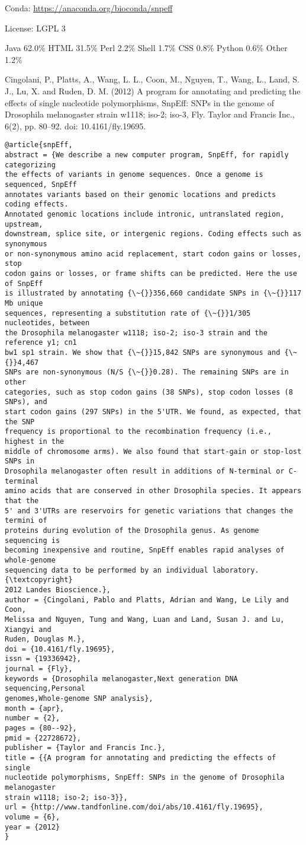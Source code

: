 \documentclass[]{article}
\begin{document}
Conda: \url{https://anaconda.org/bioconda/snpeff}

License: LGPL 3

Java 62.0\% HTML 31.5\% Perl 2.2\% Shell 1.7\% CSS 0.8\% Python 0.6\% Other 1.2\%



Cingolani, P., Platts, A., Wang, L. L., Coon, M., Nguyen, T., Wang, L., Land, S. J., Lu, X. and Ruden, D. M. (2012) A program for annotating and predicting the effects of single nucleotide polymorphisms, SnpEff: SNPs in the genome of Drosophila melanogaster strain w1118; iso-2; iso-3, Fly. Taylor and Francis Inc., 6(2), pp. 80–92. doi: 10.4161/fly.19695.

\begin{verbatim}
@article{snpEff,
abstract = {We describe a new computer program, SnpEff, for rapidly categorizing
the effects of variants in genome sequences. Once a genome is sequenced, SnpEff
annotates variants based on their genomic locations and predicts coding effects.
Annotated genomic locations include intronic, untranslated region, upstream,
downstream, splice site, or intergenic regions. Coding effects such as synonymous
or non-synonymous amino acid replacement, start codon gains or losses, stop
codon gains or losses, or frame shifts can be predicted. Here the use of SnpEff
is illustrated by annotating {\~{}}356,660 candidate SNPs in {\~{}}117 Mb unique
sequences, representing a substitution rate of {\~{}}1/305 nucleotides, between
the Drosophila melanogaster w1118; iso-2; iso-3 strain and the reference y1; cn1
bw1 sp1 strain. We show that {\~{}}15,842 SNPs are synonymous and {\~{}}4,467
SNPs are non-synonymous (N/S {\~{}}0.28). The remaining SNPs are in other
categories, such as stop codon gains (38 SNPs), stop codon losses (8 SNPs), and
start codon gains (297 SNPs) in the 5'UTR. We found, as expected, that the SNP
frequency is proportional to the recombination frequency (i.e., highest in the
middle of chromosome arms). We also found that start-gain or stop-lost SNPs in
Drosophila melanogaster often result in additions of N-terminal or C-terminal
amino acids that are conserved in other Drosophila species. It appears that the
5' and 3'UTRs are reservoirs for genetic variations that changes the termini of
proteins during evolution of the Drosophila genus. As genome sequencing is
becoming inexpensive and routine, SnpEff enables rapid analyses of whole-genome
sequencing data to be performed by an individual laboratory. {\textcopyright}
2012 Landes Bioscience.},
author = {Cingolani, Pablo and Platts, Adrian and Wang, Le Lily and Coon,
Melissa and Nguyen, Tung and Wang, Luan and Land, Susan J. and Lu, Xiangyi and
Ruden, Douglas M.},
doi = {10.4161/fly.19695},
issn = {19336942},
journal = {Fly},
keywords = {Drosophila melanogaster,Next generation DNA sequencing,Personal
genomes,Whole-genome SNP analysis},
month = {apr},
number = {2},
pages = {80--92},
pmid = {22728672},
publisher = {Taylor and Francis Inc.},
title = {{A program for annotating and predicting the effects of single
nucleotide polymorphisms, SnpEff: SNPs in the genome of Drosophila melanogaster
strain w1118; iso-2; iso-3}},
url = {http://www.tandfonline.com/doi/abs/10.4161/fly.19695},
volume = {6},
year = {2012}
}
\end{verbatim}
\end{document}
